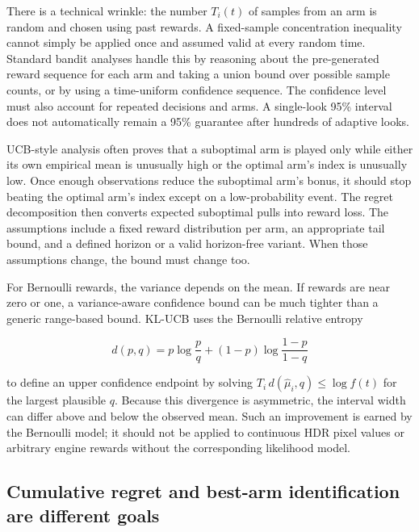 There is a technical wrinkle: the number \(T_i(t)\) of samples from an arm is random and chosen using past rewards. A fixed-sample concentration inequality cannot simply be applied once and assumed valid at every random time. Standard bandit analyses handle this by reasoning about the pre-generated reward sequence for each arm and taking a union bound over possible sample counts, or by using a time-uniform confidence sequence. The confidence level must also account for repeated decisions and arms. A single-look 95\% interval does not automatically remain a 95\% guarantee after hundreds of adaptive looks.

UCB-style analysis often proves that a suboptimal arm is played only while either its own empirical mean is unusually high or the optimal arm's index is unusually low. Once enough observations reduce the suboptimal arm's bonus, it should stop beating the optimal arm's index except on a low-probability event. The regret decomposition then converts expected suboptimal pulls into reward loss. The assumptions include a fixed reward distribution per arm, an appropriate tail bound, and a defined horizon or a valid horizon-free variant. When those assumptions change, the bound must change too.

For Bernoulli rewards, the variance depends on the mean. If rewards are near zero or one, a variance-aware confidence bound can be much tighter than a generic range-based bound. KL-UCB uses the Bernoulli relative entropy

\[
d(p,q)=p\log\frac pq+(1-p)\log\frac{1-p}{1-q}
\]

to define an upper confidence endpoint by solving \(T_i\,d(\hat\mu_i,q)\le\log f(t)\) for the largest plausible \(q\). Because this divergence is asymmetric, the interval width can differ above and below the observed mean. Such an improvement is earned by the Bernoulli model; it should not be applied to continuous HDR pixel values or arbitrary engine rewards without the corresponding likelihood model.

\subsection{Cumulative regret and best-arm identification are different goals}\label{03-visual-computing-i-ch012-cumulative-regret-and-best-arm-identification-are-different-goals}

\hypertarget{03-visual-computing-i-ch012-cumulative-regret-and-best-arm-identification-are-different-goals}{}


